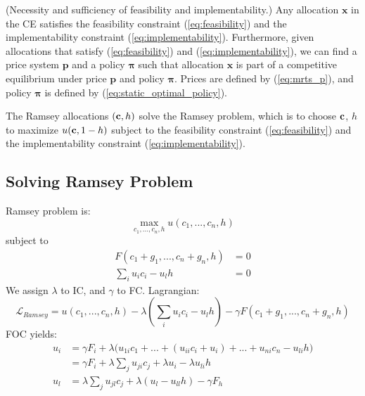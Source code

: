 \documentclass[12pt]{article}
\begin{document}
		\begin{proposition} (Necessity and sufficiency of feasibility and implementability.)
			Any allocation $\mathbf{x}$ in the CE satisfies the feasibility constraint (\ref{eq:feasibility}) and the implementability constraint (\ref{eq:implementability}). Furthermore, given allocations that satisfy (\ref{eq:feasibility}) and (\ref{eq:implementability}), we can find a price system $\mathbf{p}$ and a policy $\mathbf{\pi}$ such that allocation $\mathbf{x}$ is part of a competitive equilibrium under price $\mathbf{p}$ and policy $\mathbf{\pi}$. Prices are defined by (\ref{eq:mrts_p}), and policy $\mathbf{\pi}$ is defined by (\ref{eq:static_optimal_policy}).
	\end{proposition}
	
	\begin{proposition}
		The Ramsey allocations $(\bold{c}, h)$ solve the Ramsey problem, which is to choose $\bold{c}$, $h$ to maximize $u(\bold{c}, 1-h)$ subject to the feasibility constraint (\ref{eq:feasibility}) and the implementability constraint (\ref{eq:implementability}).
	\end{proposition}
	
	\subsection{Solving Ramsey Problem}
	Ramsey problem is:
	\begin{equation*}
		\max_{c_1, ..., c_n, h}u(c_1, ..., c_n, h)
	\end{equation*}
	subject to
	\begin{align*}
		F(c_1 + g_1, ..., c_n + g_n, h) &= 0\\
		\sum_{i} u_ic_i - u_l h &= 0
	\end{align*}
	We assign $\lambda$ to IC, and $\gamma$ to FC. Lagrangian:
	\begin{equation*}
		\mathcal{L}_{Ramsey} = u(c_1, ..., c_n, h) - \lambda(\sum_{i} u_ic_i - u_l h) - \gamma F(c_1 + g_1, ..., c_n + g_n, h)
	\end{equation*}
	FOC yields:
	\begin{align*}
		u_i &= \gamma F_i + \lambda \big(u_{1i}c_1 + ... +(u_{ii}c_i + u_i) + ... +u_{ni}c_n - u_{li}h \big)\\
		&= \gamma F_i + \lambda \sum_{j}u_{ji} c_j + \lambda u_i - \lambda u_{li}h\\
		u_l &= \lambda \sum_{j} u_{jl}c_j + \lambda (u_l- u_{ll}h) - \gamma F_h
	\end{align*}
	
\end{document}
